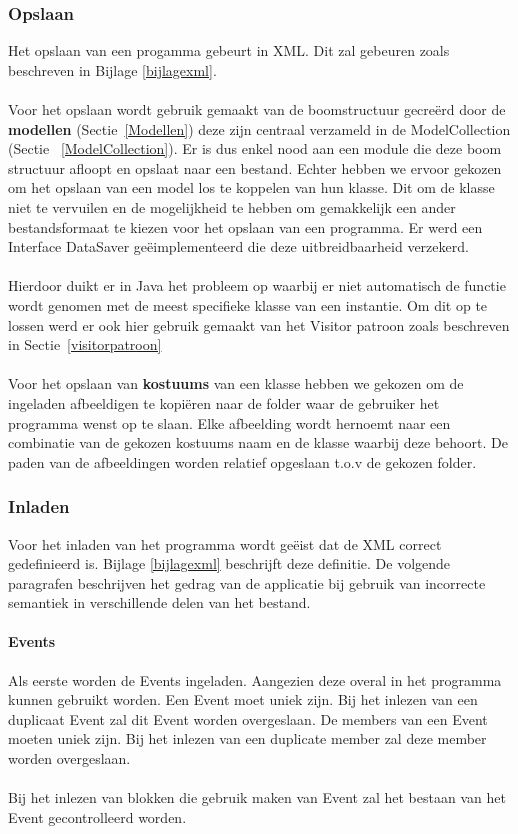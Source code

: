 \documentclass[]{article}
\begin{document}
\subsubsection{Opslaan}
Het opslaan van een progamma gebeurt in XML. Dit zal gebeuren zoals beschreven in Bijlage \ref{bijlagexml}. \\\\
Voor het opslaan wordt gebruik gemaakt van de boomstructuur gecre\"{e}rd door de \textbf{modellen} (Sectie~\ref{Modellen}) deze zijn centraal verzameld in de ModelCollection (Sectie~ \ref{ModelCollection}). Er is dus enkel nood aan een module die deze boom structuur afloopt en opslaat naar een bestand. Echter hebben we ervoor gekozen om het opslaan van een model los te koppelen van hun klasse. Dit om de klasse niet te vervuilen en de mogelijkheid te hebben om gemakkelijk een ander bestandsformaat te kiezen voor het opslaan van een programma. Er werd een Interface DataSaver ge\"{e}implementeerd die deze uitbreidbaarheid verzekerd.\\\\
Hierdoor duikt er in Java het probleem op waarbij er niet automatisch de functie wordt genomen met de meest specifieke klasse van een instantie. Om dit op te lossen werd er ook hier gebruik gemaakt van het Visitor patroon zoals beschreven in Sectie~\ref{visitorpatroon}\\\\
Voor het opslaan van \textbf{kostuums} van een klasse hebben we gekozen om de ingeladen afbeeldigen te kopi\"{e}ren naar de folder waar de gebruiker het programma wenst op te slaan. Elke afbeelding wordt hernoemt naar een combinatie van de gekozen kostuums naam en de klasse waarbij deze behoort. De paden van de afbeeldingen worden relatief opgeslaan t.o.v de gekozen folder. 
\subsubsection{Inladen}
Voor het inladen van het programma wordt ge\"{e}ist dat de XML correct gedefinieerd is. Bijlage \ref{bijlagexml} beschrijft deze definitie. De volgende paragrafen beschrijven het gedrag van de applicatie bij gebruik van incorrecte semantiek in verschillende delen van het bestand.
\paragraph{Events}
Als eerste worden de Events ingeladen. Aangezien deze overal in het programma kunnen gebruikt worden. Een Event moet uniek zijn. Bij het inlezen van een duplicaat Event zal dit Event worden overgeslaan. De members van een Event moeten uniek zijn. Bij het inlezen van een duplicate member zal deze member worden overgeslaan.\\\\
Bij het inlezen van blokken die gebruik maken van Event zal het bestaan van het Event gecontrolleerd worden. 
\end{document}
